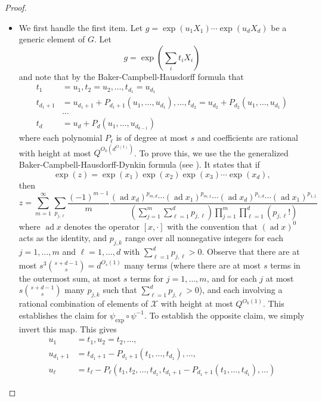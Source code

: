 \documentclass[11pt, a4paper]{amsart}
\theoremstyle{plain}
\theoremstyle{plain}
\theoremstyle{definition}
\theoremstyle{remark}
\numberwithin{equation}{section}
\numberwithin{lemma}{section}
\numberwithin{proposition}{section}
\numberwithin{corollary}{section}
\numberwithin{definition}{section}
\numberwithin{claim}{section}
\begin{document}
\begin{proof}
\begin{itemize}
\item We first handle the first item. Let $g = \exp(u_1X_1) \cdots \exp(u_dX_d)$ be a generic element of $G$. Let
$$g = \exp(\sum_i t_i X_i)$$
and note that by the Baker-Campbell-Hausdorff formula that
\begin{align*}
t_1 &= u_1, t_2 = u_2, \dots, t_{d_1} = u_{d_1} \\
t_{d_1 + 1} &= u_{d_1 + 1} + P_{d_1 + 1}(u_1, \dots, u_{d_1}), \dots, t_{d_2} = u_{d_2} + P_{d_2}(u_1, \dots, u_{d_1}) \\
&\dots \\
t_d &= u_d + P_d(u_1, \dots, u_{d_{k - 1}})
\end{align*}
where each polynomial $P_\ell$ is of degree at most $s$ and coefficients are rational with height at most $Q^{O_k(d^{O(1)})}$. To prove this, we use the the generalized Baker-Campbell-Hausdorff-Dynkin formula (see \cite{Str87}). It states that if
$$\exp(z) = \exp(x_1)\exp(x_2)\exp(x_3) \cdots \exp(x_d),$$
then
$$z = \sum_{m = 1}^\infty \sum_{p_{j, \ell}} \frac{(-1)^{m - 1}}{m} \frac{(\operatorname{ad} x_d)^{p_{m, d}} \cdots (\operatorname{ad} x_1)^{p_{m, 1}} \cdots (\operatorname{ad} x_d)^{p_{1, d}} \cdots (\operatorname{ad} x_1)^{p_{1, 1}}}{(\sum_{j = 1}^m \sum_{\ell = 1}^d p_{j, \ell}) \prod_{j = 1}^m \prod_{\ell = 1}^d (p_{j, \ell}!)}$$ 
where $\operatorname{ad} x$ denotes the operator $[x, \cdot]$ with the convention that $(\operatorname{ad} x)^0$ acts as the identity, and $p_{j, k}$ range over all nonnegative integers for each $j = 1, \dots, m$ and $\ell = 1, \dots, d$ with $\sum_{\ell = 1}^d p_{j, \ell} > 0$. Observe that there are at most $s^3\binom{s + d - 1}{s} = d^{O_s(1)}$ many terms (where there are at most $s$ terms in the outermost sum, at most $s$ terms for $j = 1, \dots, m$, and for each $j$ at most $s\binom{s + d - 1}{s}$ many $p_{j, k}$ such that $\sum_{\ell = 1}^d p_{j, \ell} > 0$), and each involving a rational combination of elements of $\mathcal{X}$ with height at most $Q^{O_k(1)}$. This establishes the claim for $\psi_{\exp} \circ \psi^{-1}$. To establish the opposite claim, we simply invert this map. This gives
\begin{align*}
u_1 &= t_1, u_2 = t_2, \dots, \\
u_{d_1 + 1} &= t_{d_1 + 1} - P_{d_1 + 1}(t_1, \dots, t_{d_1}), \dots, \\
u_\ell &= t_\ell - P_\ell(t_1, t_2, \dots, t_{d_1}, t_{d_1 + 1} - P_{d_1 + 1}(t_1, \dots, t_{d_1}), \dots)

\end{align*}
\end{itemize}
\end{proof}
\end{document}
